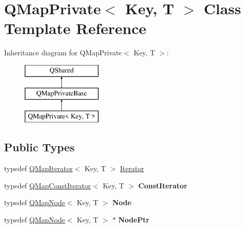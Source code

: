 \hypertarget{class_q_map_private}{}\section{Q\+Map\+Private$<$ Key, T $>$ Class Template Reference}
\label{class_q_map_private}
Inheritance diagram for Q\+Map\+Private$<$ Key, T $>$\+:\begin{figure}[H]
\begin{center}
\leavevmode
\includegraphics[height=3.000000cm]{class_q_map_private}
\end{center}
\end{figure}
\subsection*{Public Types}
\begin{DoxyCompactItemize}
\item 
typedef \mbox{\hyperlink{class_q_map_iterator}{Q\+Map\+Iterator}}$<$ Key, T $>$ \mbox{\hyperlink{class_q_map_private_a5326545ba578532909650c2f4a8d4d34}{Iterator}}
\item 
\mbox{\label{class_q_map_private_a579a86f244015186e41bfa3cf85a5054}} 
typedef \mbox{\hyperlink{class_q_map_const_iterator}{Q\+Map\+Const\+Iterator}}$<$ Key, T $>$ {\bfseries Const\+Iterator}
\item 
\mbox{\label{class_q_map_private_a14bbee368a168ea06680b51eef901c27}} 
typedef \mbox{\hyperlink{struct_q_map_node}{Q\+Map\+Node}}$<$ Key, T $>$ {\bfseries Node}
\item 
\mbox{\label{class_q_map_private_a6b529a90a461f2d2df3e1b2356250fb4}} 
typedef \mbox{\hyperlink{struct_q_map_node}{Q\+Map\+Node}}$<$ Key, T $>$ $\ast$ {\bfseries Node\+Ptr}
\end{DoxyCompactItemize}

